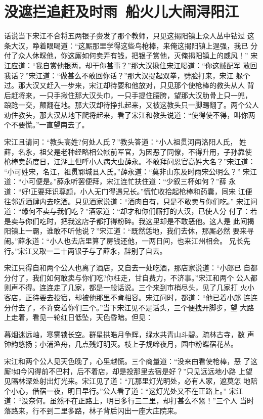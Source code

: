 \chapter{没遮拦追赶及时雨~船火儿大闹浔阳江}

话说当下宋江不合将五两银子赍发了那个教师，只见这揭阳镇上众人丛中钻过
这条大汉，睁着眼喝道：“这厮那里学得这些鸟枪棒，来俺这揭阳镇上逞强，我已
分付了众人休睬他，你这厮如何卖弄有钱，把银子赏他，灭俺揭阳镇上的威风！”
宋江应道：“我自赏他银两，却干你甚事？”那大汉揪住宋江喝道：“你这贼配军
敢回我话？”宋江道：“做甚么不敢回你话？”那大汉提起双拳，劈脸打来，宋江
躲个过。那大汉又赶入一步来，宋江却待要和他放对，只见那个使枪棒的教头从人
背后赶将来，一只手揪住那大汉头巾，一只手提住腰胯，望那大汉肋骨上只一兜，
踉跄一交，颠翻在地。那大汉却待挣扎起来，又被这教头只一脚踢翻了。两个公人
劝住教头，那大汉从地下爬将起来，看了宋江和教头说道：“使得使不得，叫你两
个不要慌。”一直望南去了。

宋江且请问：“教头高姓?何处人氏？”教头答道：“小人祖贯河南洛阳人氏，
姓薛，名永，祖父是老种经略相公帐前军官，为因恶了同僚，不得升用，子孙靠使
枪棒卖药度日，江湖上但呼小人病大虫薛永。不敢拜问恩官高姓大名？”宋江道：
“小可姓宋，名江，祖贯郓城县人氏。”薛永道：“莫非山东及时雨宋公明么？”
宋江道：“小可便是。”薛永听罢便拜，宋江连忙扶住道：“少叙三杯如何？”薛
永道：“好!正要拜识尊颜，小人无门得遇兄长。”慌忙收拾起枪棒和药囊，同宋
江便往邻近酒肆内去吃酒。只见酒家说道：“酒肉自有，只是不敢卖与你们吃。”
宋江问道：“缘何不卖与我们吃？”酒家道：“却才和你们厮打的大汉，已使人分
付了：若是卖与你们吃时，把我这店子都打得粉碎。我这里却是不敢恶他。这人是
此间揭阳镇上一霸，谁敢不听他说？”宋江道：“既然恁地，我们去休，那厮必然
要来寻闹。”薛永道：“小人也去店里算了房钱还他，一两日间，也来江州相会。
兄长先行。”宋江又取一二十两银子与了薛永，辞别了自去。

宋江只得自和两个公人也离了酒店，又自去一处吃酒，那店家说道：“小郎已
自都分付了，我们如何敢卖与你们吃?你枉走，甘自费力，不济事。”宋江和两个
公人都则声不得。连连走了几家，都是一般话说。三个来到市梢尽头，见了几家打
火小客店，正待要去投宿，却被他那里不肯相容。宋江问时，都道：“他已着小郎
连连分付去了，不许安着你们三个。”当下宋江见不是话头，三个便拽开脚步，望
大路上走着，看见一轮红日低坠，天色昏暗。但见：

暮烟迷远岫，寒雾锁长空。群星拱皓月争辉，绿水共青山斗碧。疏林古寺，数
声钟韵悠扬；小浦渔舟，几点残灯明灭。枝上子规啼夜月，园中粉蝶宿花丛。

宋江和两个公人见天色晚了，心里越慌。三个商量道：“没来由看使枪棒，恶
了这厮!如今闪得前不巴村，后不着店，却是投那里去宿是好？”只见远远地小路
上望见隔林深处射出灯光来。宋江见了道：“兀那里灯光明处，必有人家，遮莫怎
地陪个小心，借宿一夜，明日早行。”公人看了道：“这灯光处又不在正路上。”
宋江道：“没奈何。虽然不在正路上，明日多行三二里，却打甚么不紧！”三个人
当时落路来，行不到二里多路，林子背后闪出一座大庄院来。

